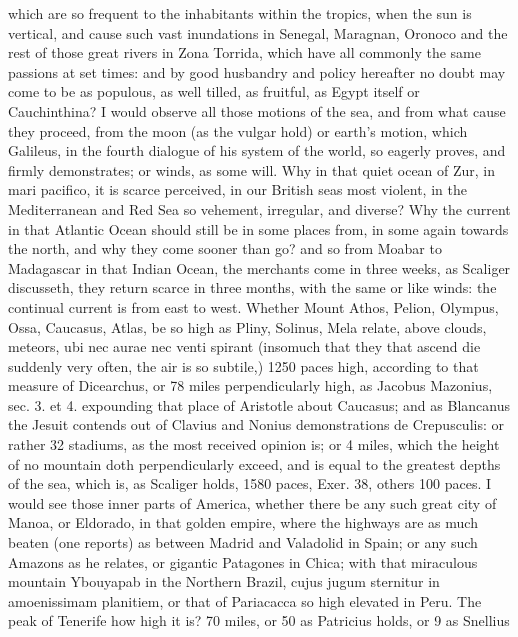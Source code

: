 {which are so frequent to the inhabitants within the tropics, when the
sun is vertical, and cause such vast inundations in Senegal, Maragnan,
Oronoco and the rest of those great rivers in Zona Torrida, which have
all commonly the same passions at set times: and by good husbandry and
policy hereafter no doubt may come to be as populous, as well tilled,
as fruitful, as Egypt itself or Cauchinthina? I would observe all those
motions of the sea, and from what cause they proceed, from the moon (as
the vulgar hold) or earth's motion, which Galileus, in the fourth
dialogue of his system of the world, so eagerly proves, and firmly
demonstrates; or winds, as  some will. Why in that quiet ocean of
Zur, in mari pacifico, it is scarce perceived, in our British seas most
violent, in the Mediterranean and Red Sea so vehement, irregular, and
diverse? Why the current in that Atlantic Ocean should still be in some
places from, in some again towards the north, and why they come sooner
than go? and so from Moabar to Madagascar in that Indian Ocean, the
merchants come in three weeks, as Scaliger discusseth, they
return scarce in three months, with the same or like winds: the
continual current is from east to west. Whether Mount Athos, Pelion,
Olympus, Ossa, Caucasus, Atlas, be so high as Pliny, Solinus, Mela
relate, above clouds, meteors, ubi nec aurae nec venti spirant
(insomuch that they that ascend die suddenly very often, the air is so
subtile,) 1250 paces high, according to that measure of Dicearchus, or
78 miles perpendicularly high, as Jacobus Mazonius, sec. 3. et 4.
expounding that place of Aristotle about Caucasus; and as
Blancanus the Jesuit contends out of Clavius and Nonius
demonstrations de Crepusculis: or rather 32 stadiums, as the most
received opinion is; or 4 miles, which the height of no mountain doth
perpendicularly exceed, and is equal to the greatest depths of the sea,
which is, as Scaliger holds, 1580 paces, Exer. 38, others 100 paces. I
would see those inner parts of America, whether there be any such great
city of Manoa, or Eldorado, in that golden empire, where the highways
are as much beaten (one reports) as between Madrid and Valadolid in
Spain; or any such Amazons as he relates, or gigantic Patagones in
Chica; with that miraculous mountain Ybouyapab in the Northern
Brazil, cujus jugum sternitur in amoenissimam planitiem, \etc{} or that of
Pariacacca so high elevated in Peru. The peak of Tenerife how
high it is? 70 miles, or 50 as Patricius holds, or 9 as Snellius
}
